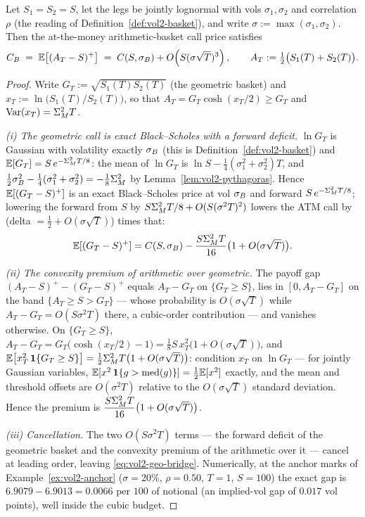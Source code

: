 \begin{lemma}
\label{lem:vol2-geo-bridge}
Let $S_1 = S_2 = S$, let the legs be jointly lognormal with vols
$\sigma_1, \sigma_2$ and correlation $\rho$ (the reading of
Definition~\ref{def:vol2-basket}), and write $\sigma := \max(\sigma_1,
\sigma_2)$. Then the at-the-money arithmetic-basket call price satisfies
\begin{equation}
C_B \;=\; \mathbb{E}\bigl[(A_T - S)^{+}\bigr]
    \;=\; C(S, \sigma_B) + O\!\left(S(\sigma\sqrt{T})^3\right),
\qquad A_T := \tfrac12\bigl(S_1(T) + S_2(T)\bigr).
\label{eq:vol2-geo-bridge}
\end{equation}
\end{lemma}

\begin{proof}
Write $G_T := \sqrt{S_1(T) S_2(T)}$ (the geometric basket) and
$x_T := \ln\bigl(S_1(T)/S_2(T)\bigr)$, so that
$A_T = G_T \cosh(x_T/2) \ge G_T$ and $\operatorname{Var}(x_T) = \Sigma_M^2 T$.

\emph{(i) The geometric call is exact Black--Scholes with a forward
deficit.} $\ln G_T$ is Gaussian with volatility exactly $\sigma_B$ (this is
Definition~\ref{def:vol2-basket}) and
$\mathbb{E}[G_T] = S\,e^{-\Sigma_M^2 T/8}$: the mean of $\ln G_T$ is
$\ln S - \tfrac14(\sigma_1^2+\sigma_2^2)T$, and
$\tfrac12\sigma_B^2 - \tfrac14(\sigma_1^2+\sigma_2^2) = -\tfrac18\Sigma_M^2$ by
Lemma~\ref{lem:vol2-pythagoras}. Hence $\mathbb{E}[(G_T - S)^{+}]$ is an exact
Black--Scholes price at vol $\sigma_B$ and forward $S\,e^{-\Sigma_M^2 T/8}$;
lowering the forward from $S$ by $S\Sigma_M^2 T/8 + O(S(\sigma^2 T)^2)$
lowers the ATM call by (delta $= \tfrac12 + O(\sigma\sqrt{T})$) times that:
\[
\mathbb{E}[(G_T - S)^{+}] = C(S, \sigma_B)
 - \frac{S\Sigma_M^2 T}{16}\bigl(1 + O(\sigma\sqrt{T})\bigr).
\]

\emph{(ii) The convexity premium of arithmetic over geometric.} The payoff
gap $(A_T - S)^{+} - (G_T - S)^{+}$ equals $A_T - G_T$ on
$\{G_T \ge S\}$, lies in $[0, A_T - G_T]$ on the band
$\{A_T \ge S > G_T\}$ --- whose probability is $O(\sigma\sqrt{T})$ while
$A_T - G_T = O(S\sigma^2 T)$ there, a cubic-order contribution --- and
vanishes otherwise. On $\{G_T \ge S\}$,
$A_T - G_T = G_T\bigl(\cosh(x_T/2) - 1\bigr)
 = \tfrac18 S\,x_T^2\bigl(1 + O(\sigma\sqrt{T})\bigr)$, and
$\mathbb{E}\bigl[x_T^2\,\mathbf{1}\{G_T \ge S\}\bigr]
 = \tfrac12\Sigma_M^2 T\bigl(1 + O(\sigma\sqrt{T})\bigr)$: condition $x_T$
on $\ln G_T$ --- for jointly Gaussian variables,
$\mathbb{E}[x^2\,\mathbf{1}\{g > \operatorname{med}(g)\}] = \tfrac12\mathbb{E}[x^2]$
exactly, and the mean and threshold offsets are $O(\sigma^2 T)$ relative to
the $O(\sigma\sqrt{T})$ standard deviation. Hence the premium is
$\dfrac{S\Sigma_M^2 T}{16}\bigl(1 + O(\sigma\sqrt{T})\bigr)$.

\emph{(iii) Cancellation.} The two $O(S\sigma^2 T)$ terms --- the forward
deficit of the geometric basket and the convexity premium of the arithmetic
over it --- cancel at leading order, leaving \eqref{eq:vol2-geo-bridge}.
Numerically, at the anchor marks of Example~\ref{ex:vol2-anchor}
($\sigma = 20\%$, $\rho = 0.50$, $T = 1$, $S = 100$) the exact gap is
$6.9079 - 6.9013 = 0.0066$ per $100$ of notional (an implied-vol gap of
$0.017$ vol points), well inside the cubic budget.
\end{proof}


